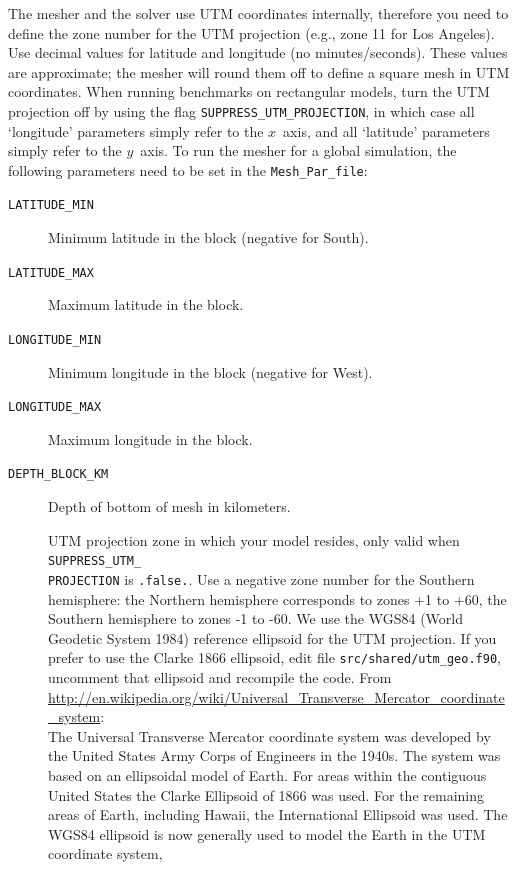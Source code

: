 The mesher and the solver use UTM coordinates internally, therefore
you need to define the zone number for the UTM projection (e.g., zone
11 for Los Angeles). Use decimal values for latitude and longitude
(no minutes/seconds). These values are approximate; the mesher will
round them off to define a square mesh in UTM coordinates. When running
benchmarks on rectangular models, turn the UTM projection off by using
the flag \texttt{\small SUPPRESS\_UTM\_PROJECTION}{\small , in which
case all `longitude' parameters simply refer to the $x$~axis, and
all `latitude' parameters simply refer to the $y$~axis. To run the
mesher for a global simulation, the following parameters need to be
set in the }\texttt{\small Mesh\_Par\_file}{\small :}{\small \par}
\begin{description}
\item [{\texttt{LATITUDE\_MIN}}] Minimum latitude in the block (negative
for South).
\item [{\texttt{LATITUDE\_MAX}}] Maximum latitude in the block.
\item [{\texttt{LONGITUDE\_MIN}}] Minimum longitude in the block (negative
for West).
\item [{\texttt{LONGITUDE\_MAX}}] Maximum longitude in the block.
\item [{\texttt{DEPTH\_BLOCK\_KM}}] Depth of bottom of mesh in kilometers.
\item [{\texttt{}}] UTM projection zone in
which your model resides, only valid when \texttt{SUPPRESS\_UTM\_}~\\
 \texttt{PROJECTION} is \texttt{.false.}.
Use a negative zone number for the Southern hemisphere:
the Northern hemisphere corresponds to zones +1 to +60,
the Southern hemisphere to zones -1 to -60.
We use the WGS84 (World Geodetic System 1984) reference ellipsoid for the UTM projection. If you prefer to use the Clarke 1866 ellipsoid,
edit file \texttt{src/shared/utm\_geo.f90}, uncomment that ellipsoid and recompile the code.
From \url{http://en.wikipedia.org/wiki/Universal_Transverse_Mercator_coordinate_system}:\\
The Universal Transverse Mercator coordinate system was developed by the United States Army Corps of Engineers in the 1940s.
The system was based on an ellipsoidal model of Earth. For areas within the contiguous United States
the Clarke Ellipsoid of 1866 was used. For the remaining areas of Earth, including Hawaii, the International Ellipsoid was used.
The WGS84 ellipsoid is now generally used to model the Earth in the UTM coordinate system,

\end{description}
